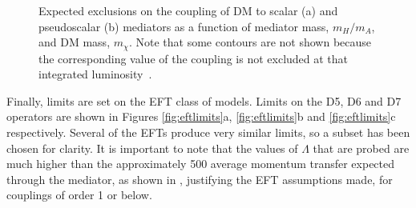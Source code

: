 \begin{figure}

  \caption{Expected exclusions on the coupling of \ac{DM} to scalar (a) and pseudoscalar (b) mediators as a function of mediator mass, $m_{H}/m_{A}$, and \ac{DM} mass, $m_{\chi}$. Note that some contours are not shown because the corresponding value of the coupling is not excluded at that integrated luminosity~\cite{ourdmpaper}.}
  \label{fig:simplifiedmodellimits}
\end{figure}

Finally, limits are set on the \ac{EFT} class of models. Limits on the D5, D6 and D7 operators are shown in Figures \ref{fig:eftlimits}a, \ref{fig:eftlimits}b and \ref{fig:eftlimits}c respectively. Several of the \ac{EFT}s produce very similar limits, so a subset has been chosen for clarity. It is important to note that the values of $\Lambda$ that are probed are much higher than the approximately 500 \GeV average momentum transfer expected through the mediator, as shown in , justifying the \ac{EFT} assumptions made, for couplings of order 1 or below.

